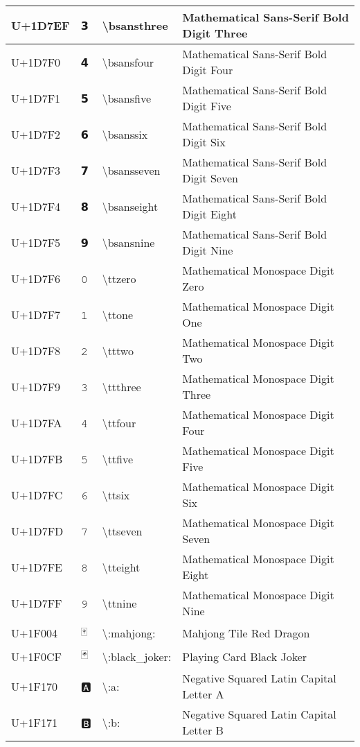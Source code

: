 \begin{table}[h]
\begin{tabulary}{\linewidth}{|L|L|L|L|}
\hline
U+1D7EF & 𝟯 & {\textbackslash}bsansthree & Mathematical Sans-Serif Bold Digit Three \\
\hline
U+1D7F0 & 𝟰 & {\textbackslash}bsansfour & Mathematical Sans-Serif Bold Digit Four \\
\hline
U+1D7F1 & 𝟱 & {\textbackslash}bsansfive & Mathematical Sans-Serif Bold Digit Five \\
\hline
U+1D7F2 & 𝟲 & {\textbackslash}bsanssix & Mathematical Sans-Serif Bold Digit Six \\
\hline
U+1D7F3 & 𝟳 & {\textbackslash}bsansseven & Mathematical Sans-Serif Bold Digit Seven \\
\hline
U+1D7F4 & 𝟴 & {\textbackslash}bsanseight & Mathematical Sans-Serif Bold Digit Eight \\
\hline
U+1D7F5 & 𝟵 & {\textbackslash}bsansnine & Mathematical Sans-Serif Bold Digit Nine \\
\hline
U+1D7F6 & 𝟶 & {\textbackslash}ttzero & Mathematical Monospace Digit Zero \\
\hline
U+1D7F7 & 𝟷 & {\textbackslash}ttone & Mathematical Monospace Digit One \\
\hline
U+1D7F8 & 𝟸 & {\textbackslash}tttwo & Mathematical Monospace Digit Two \\
\hline
U+1D7F9 & 𝟹 & {\textbackslash}ttthree & Mathematical Monospace Digit Three \\
\hline
U+1D7FA & 𝟺 & {\textbackslash}ttfour & Mathematical Monospace Digit Four \\
\hline
U+1D7FB & 𝟻 & {\textbackslash}ttfive & Mathematical Monospace Digit Five \\
\hline
U+1D7FC & 𝟼 & {\textbackslash}ttsix & Mathematical Monospace Digit Six \\
\hline
U+1D7FD & 𝟽 & {\textbackslash}ttseven & Mathematical Monospace Digit Seven \\
\hline
U+1D7FE & 𝟾 & {\textbackslash}tteight & Mathematical Monospace Digit Eight \\
\hline
U+1D7FF & 𝟿 & {\textbackslash}ttnine & Mathematical Monospace Digit Nine \\
\hline
U+1F004 & 🀄 & {\textbackslash}:mahjong: & Mahjong Tile Red Dragon \\
\hline
U+1F0CF & 🃏 & {\textbackslash}:black\_joker: & Playing Card Black Joker \\
\hline
U+1F170 & 🅰 & {\textbackslash}:a: & Negative Squared Latin Capital Letter A \\
\hline
U+1F171 & 🅱 & {\textbackslash}:b: & Negative Squared Latin Capital Letter B \\

\end{tabulary}
\end{table}
